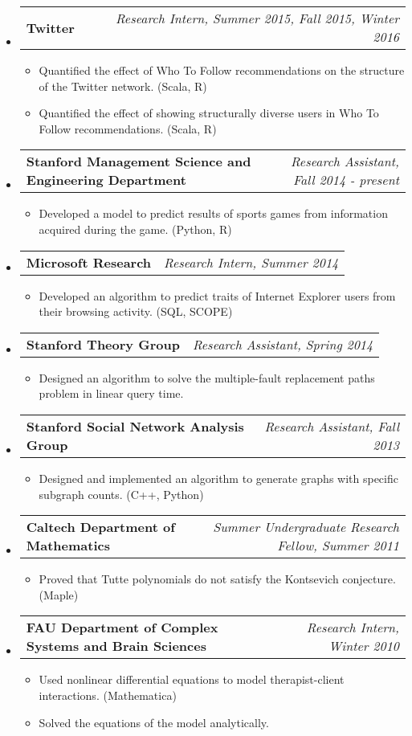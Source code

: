 \documentclass[letterpaper,10pt]{article}
\makeatletter
\newcommand{\resitem}[1]{\item #1 \vspace{-2pt}}
\newcommand{\ressubheading}[4]{
\begin{tabular*}{7.0in}{l@{\extracolsep{\fill}}r}
		\textbf{#1} & \textit{#4} \\
\end{tabular*}\vspace{-6pt}}
\makeatother
\begin{document}
\begin{itemize}
\item
	\ressubheading{Twitter}{San Francisco, CA}{Research Intern}{Research Intern, Summer 2015, Fall 2015, Winter 2016}
	\begin{itemize}
		\resitem{Quantified the effect of Who To Follow recommendations on the structure of the Twitter network. (Scala, R)}
    \resitem{Quantified the effect of showing structurally diverse users in Who To Follow recommendations. (Scala, R)}
	\end{itemize}
\item
	\ressubheading{Stanford Management Science and Engineering Department}{Stanford, CA}{Research Assistant}{Research Assistant, Fall 2014 - present}
	\begin{itemize}
		\resitem{Developed a model to predict results of sports games from information acquired during the game. (Python, R)}
	\end{itemize}
\item
	\ressubheading{Microsoft Research}{Mountain View, CA}{Intern}{Research Intern, Summer 2014}
	\begin{itemize}
		\resitem{Developed an algorithm to predict traits of Internet Explorer users from their browsing activity. (SQL, SCOPE)}
	\end{itemize}
\item
	\ressubheading{Stanford Theory Group}{Stanford, CA}{Research Assistant}{Research Assistant, Spring 2014}
	\begin{itemize}
		\resitem{Designed an algorithm to solve the multiple-fault replacement paths problem in linear query time.}
	\end{itemize}
\item
	\ressubheading{Stanford Social Network Analysis Group}{Stanford, CA}{Research Assistant}{Research Assistant, Fall 2013}
	\begin{itemize}
		\resitem{Designed and implemented an algorithm to generate graphs with specific subgraph counts.  (C++, Python)}
	\end{itemize}
\item
	\ressubheading{Caltech Department of Mathematics}{Pasadena, CA}{Summer Undergraduate Research Fellow}{Summer Undergraduate Research Fellow, Summer 2011}
	\begin{itemize}
		\resitem{Proved that Tutte polynomials do not satisfy the Kontsevich conjecture.  (Maple)}
	\end{itemize}
\item
	\ressubheading{FAU Department of Complex Systems and Brain Sciences}{Boca Raton, FL}{Research Intern}{Research Intern, Winter 2010}
	\begin{itemize}
		\resitem{Used nonlinear differential equations to model therapist-client interactions.  (Mathematica)}
		\resitem{Solved the equations of the model analytically.}
	\end{itemize}

\end{itemize}
\end{document}
